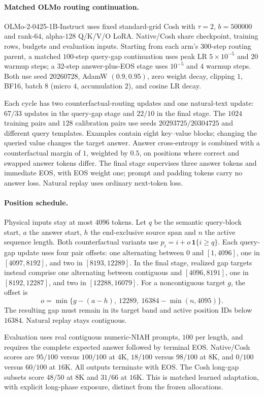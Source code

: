 \paragraph{Matched OLMo routing continuation.}\label{sec:olmo2-1b}
OLMo-2-0425-1B-Instruct uses fixed standard-grid Cosh with $\tau=2$,
$b=500000$ and rank-$64$, alpha-$128$ Q/K/V/O LoRA. Native/Cosh share
checkpoint, training rows, budgets and evaluation inputs. Starting from each
arm's $300$-step routing parent, a matched $100$-step query-gap continuation
uses peak LR $5\times10^{-5}$ and $20$ warmup steps; a $32$-step
answer-plus-EOS stage uses $10^{-5}$ and $4$ warmup steps. Both use seed
$20260728$, AdamW $(0.9,0.95)$, zero weight decay, clipping $1$, BF16,
batch $8$ (micro $4$, accumulation $2$), and cosine LR decay.

Each cycle has two counterfactual-routing updates and one natural-text update:
$67/33$ updates in the query-gap stage and $22/10$ in the final stage.
The $1024$ training pairs and $128$ calibration pairs use seeds
$20293725/20304725$ and different query templates. Examples contain eight
key--value blocks; changing the queried value changes the target answer.
Answer cross-entropy is combined with a counterfactual margin of $1$, weighted
by $0.5$, on positions where correct and swapped answer tokens differ.
The final stage supervises three answer tokens and immediate EOS, with EOS
weight one; prompt and padding tokens carry no answer loss. Natural replay
uses ordinary next-token loss.

\paragraph{Position schedule.}
Physical inputs stay at most $4096$ tokens. Let $q$ be the semantic query-block
start, $a$ the answer start, $h$ the end-exclusive source span and $n$ the active
sequence length. Both counterfactual variants use
$p_i=i+o\,\mathbf1\{i\ge q\}$. Each query-gap update uses four pair offsets:
one alternating between $0$ and $[1,4096]$, one in $[4097,8192]$, and two
in $[8193,12289]$. In the final stage, realized gap
targets instead comprise one alternating between contiguous and $[4096,8191]$,
one in $[8192,12287]$, and two in $[12288,16079]$. For a noncontiguous target
$g$, the offset is
\[
o=\min\{g-(a-h),\ 12289,\ 16384-\min(n,4095)\}.
\]
The resulting gap must remain in its target band and active position IDs below
$16384$. Natural replay stays contiguous. 

Evaluation uses real contiguous numeric-NIAH prompts, $100$ per length,
and requires the complete expected answer followed by terminal EOS.
Native/Cosh scores are $95/100$ versus $100/100$ at $4$K,
$18/100$ versus $98/100$ at $8$K, and $0/100$ versus $60/100$ at $16$K.
All outputs terminate with EOS. The Cosh long-gap subsets score $48/50$
at $8$K and $31/66$ at $16$K. This is matched learned adaptation, with
explicit long-phase exposure, distinct from the frozen allocations.

